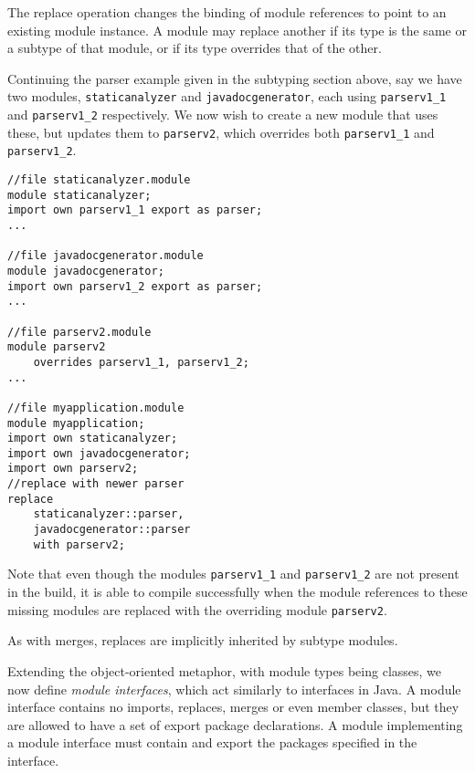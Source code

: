 The replace operation
changes the binding of module references to point to an existing
module instance. A module may replace another if its type is the same or a subtype
of that module, or if its type overrides that of the other.

Continuing the parser example given in the subtyping section above, say we have two 
modules, {\tt staticanalyzer} and {\tt javadocgenerator}, each using {\tt parserv1\_1}
and {\tt parserv1\_2} respectively. We now wish to create a new module that uses these, 
but updates them to {\tt parserv2}, which overrides both {\tt parserv1\_1} and {\tt parserv1\_2}.

\begin{lstlisting}[caption=Module Replace]
//file staticanalyzer.module
module staticanalyzer;
import own parserv1_1 export as parser;
...

//file javadocgenerator.module
module javadocgenerator;
import own parserv1_2 export as parser;
...

//file parserv2.module
module parserv2 
	overrides parserv1_1, parserv1_2;
...

//file myapplication.module
module myapplication;
import own staticanalyzer;
import own javadocgenerator;
import own parserv2;
//replace with newer parser
replace 
	staticanalyzer::parser,
	javadocgenerator::parser
	with parserv2;
\end{lstlisting}

Note that even though the modules {\tt parserv1\_1} and {\tt parserv1\_2}
are not present in the build, it is able to compile successfully when the
module references to these missing modules are replaced with the overriding
module {\tt parserv2}.

As with merges, replaces are implicitly inherited by subtype modules.



Extending the object-oriented metaphor, with module types being classes, we 
now define \textit{module interfaces}, which act similarly to interfaces in Java. A module
interface contains no imports, replaces, merges or even member classes, but they
are allowed to have a set of export package declarations. A module implementing
a module interface must contain and export the packages specified in the interface.

